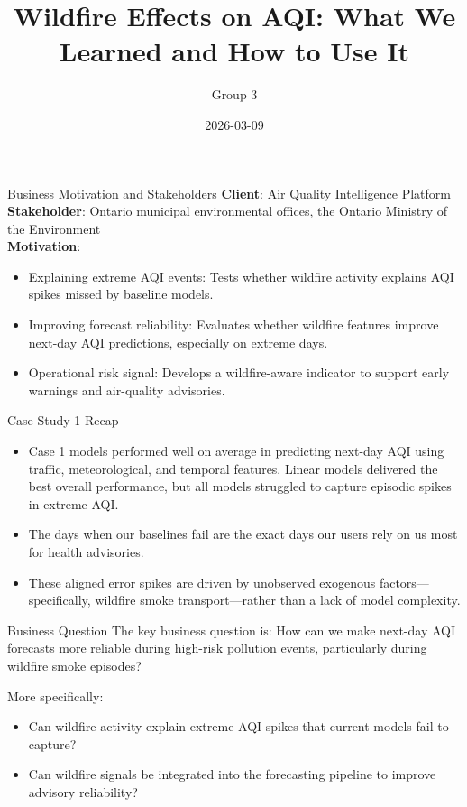 \documentclass[aspectratio=169]{beamer}
\title{Wildfire Effects on AQI: What We Learned and How to Use It}
\author{Group 3}
\date{2026-03-09}
\begin{document}
\frame{\titlepage}


\begin{frame}{Business Motivation and Stakeholders}
\textbf{Client}: Air Quality Intelligence Platform \\
\textbf{Stakeholder}: Ontario municipal environmental offices, the Ontario
Ministry of the Environment\\
\textbf{Motivation}: \\
    \begin{itemize}
    \item Explaining extreme AQI events: Tests whether wildfire activity explains AQI spikes missed by baseline models.
    \item Improving forecast reliability: Evaluates whether wildfire features improve next-day AQI predictions, especially on extreme days.
    \item Operational risk signal: Develops a wildfire-aware indicator to support early warnings and air-quality advisories.
    \end{itemize}
\end{frame}


\begin{frame}{Case Study 1 Recap}
\begin{itemize}
    \item Case 1 models performed well on average in predicting next-day AQI using traffic, meteorological, and temporal features. Linear models delivered the best overall performance, but all models struggled to capture episodic spikes in extreme AQI.
    \item The days when our baselines fail are the exact days our users rely on us most for health advisories.
    \item These aligned error spikes are driven by unobserved exogenous factors---specifically, wildfire smoke transport---rather than a lack of model complexity.
\end{itemize}
\end{frame}

\begin{frame}{Business Question}
The key business question is: How can we make next-day AQI forecasts more reliable during high-risk pollution events, particularly during wildfire smoke episodes?

\vspace{0.5em}
More specifically:
\begin{itemize}
    \item Can wildfire activity explain extreme AQI spikes that current models fail to capture?
    \item Can wildfire signals be integrated into the forecasting pipeline to improve advisory reliability?
\end{itemize}
\end{frame}
\end{document}
